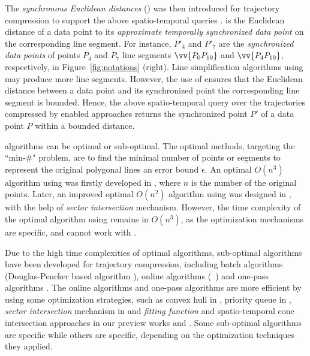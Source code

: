 The \emph{synchronous Euclidean distances} (\sed) was then introduced for trajectory compression to support the above spatio-temporal queries \cite{Meratnia:Spatiotemporal}. \sed is the Euclidean distance of a data point to its \emph{approximate temporally synchronized data point \cite{Meratnia:Spatiotemporal}} on the corresponding line segment. For instance, $P'_4$ and $P'_7$ are the \emph{synchronized data points} of points $P_4$ and $P_7$ \wrt line segments $\vv{P_0P_{10}}$ and $\vv{P_4P_{10}}$, respectively, in Figure~\ref{fig:notations} (right).
Line simplification algorithms using \sed may produce more line segments. However, the use of \sed ensures that the Euclidean distance between a data point and its  synchronized point \wrt the corresponding line segment is bounded. Hence, the above spatio-temporal query over the trajectories compressed by \sed enabled approaches returns the synchronized point $P'$ of a data point $P$ within a bounded distance.

\lsa algorithms can be optimal or sub-optimal.
The optimal methods, targeting the ``min-\#" problem\cite{Imai:Optimal,Chan:Optimal}, are to find the minimal number of points or segments to represent the original polygonal lines \wrt an error bound $\epsilon$.
An optimal $O(n^3)$  \lsa algorithm using \ped was firstly developed in \cite{Imai:Optimal},  where $n$ is the number of the original points.
%
Later, an improved optimal  $O(n^2)$  algorithm using \ped was designed in \cite{Chan:Optimal}, with the help of \textit{sector intersection} mechanism.
However, the time complexity of the optimal \lsa algorithm using \sed remains in $O(n^3)$, as the optimization mechanisms are \ped specific, and cannot work with \sed.

Due to the high time complexities of optimal \lsa algorithms, sub-optimal \lsa algorithms have been developed for trajectory compression, including batch algorithms (\eg Douglas-Peucker based algorithm \dpsed \cite{Meratnia:Spatiotemporal}), online algorithms (\eg\ \squishe \cite{Muckell:Compression}) and one-pass algorithms \cite{Williams:Longest, Sklansky:Cone, Dunham:Cone, Zhao:Sleeve, Lin:Operb, Lin:Cised}. The online algorithms and one-pass algorithms are more efficient by using some optimization strategies, such as convex hull in \cite{Liu:BQS}, priority queue in \cite{Muckell:Compression}, \textit{sector intersection} mechanism in \cite{Williams:Longest, Sklansky:Cone, Dunham:Cone, Zhao:Sleeve} and \textit{fitting function} and spatio-temporal cone intersection approaches in our preview works \cite {Lin:Operb} and \cite {Lin:Cised}. Some sub-optimal algorithms are \ped specific while others are \sed specific, depending on the optimization techniques they applied.


